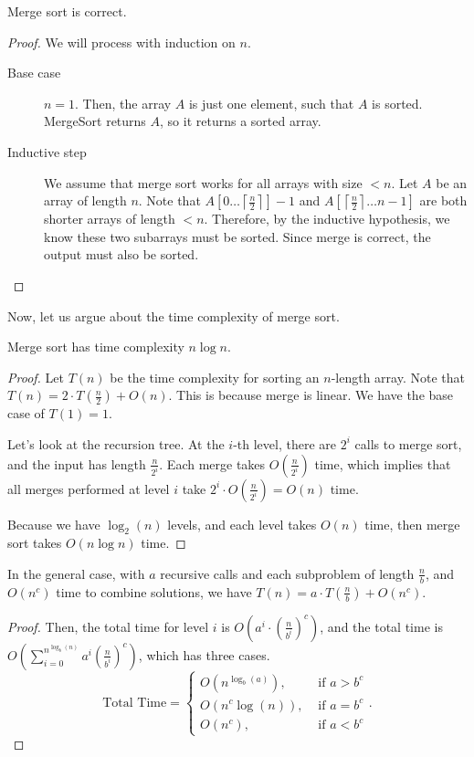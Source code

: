 \begin{theorem}
	Merge sort is correct.
\end{theorem}
\begin{proof}
	We will process with induction on \( n \).
	\begin{description}
		\item[Base case] \( n=1 \). Then, the array \( A \) is just one element, such that \( A \) is sorted. MergeSort returns \( A \), so it returns a sorted array.
		\item[Inductive step] We assume that merge sort works for all arrays with size \( < n \). Let \( A \) be an array of length \( n \). Note that \( A[0\ldots \left\lceil \frac{n}{2} \right\rceil ]-1 \) and \( A[\left\lceil \frac{n}{2} \right\rceil \ldots n-1] \) are both shorter arrays of length \( <n \). Therefore, by the inductive hypothesis, we know these two subarrays must be sorted. Since merge is correct, the output must also be sorted.
	\end{description}
\end{proof}

Now, let us argue about the time complexity of merge sort.

\begin{theorem}
	Merge sort has time complexity \( n\log n \).
\end{theorem}
\begin{proof}
	Let \( T(n) \) be the time complexity for sorting an \( n \)-length array. Note that \( T(n)=2\cdot T(\frac{n}{2}) + O(n) \). This is because merge is linear. We have the base case of \( T(1)=1 \). 

	Let's look at the recursion tree. At the \( i \)-th level, there are \( 2^i \) calls to merge sort, and the input has length \( \frac{n}{2^i} \). Each merge takes \( O(\frac{n}{2^i}) \) time, which implies that all merges performed at level \( i \) take \( 2^i \cdot O(\frac{n}{2^i}) = O(n)\) time.

	Because we have \( \log_2(n) \) levels, and each level takes \( O(n) \) time, then merge sort takes \( O(n\log n) \) time.
\end{proof}

\begin{theorem}
	In the general case, with \( a \) recursive calls and each subproblem of length \( \frac{n}{b} \), and \( O(n^c) \) time to combine solutions, we have \( T(n) = a \cdot T(\frac{n}{b}) + O(n^c) \).
\end{theorem}
\begin{proof}
	Then, the total time for level \( i \) is \( O(a^i \cdot \left(\frac{n}{b^i}\right)^c) \), and the total time is \( O(\sum_{i=0}^{n^{\log_b(n)}} a^i \left( \frac{n}{b^i} \right)^c ) \), which has three cases.
	\[
		\text{Total Time} = \begin{cases}
			O(n^{\log _b(a)} ), &\text{ if } a > b^{c} \\ 
			O(n^{c}\log (n) ), &\text{ if } a = b^{c} \\
			O(n^{c} ), &\text{ if } a < b^{c} 
		\end{cases}
	.\] 
\end{proof}
